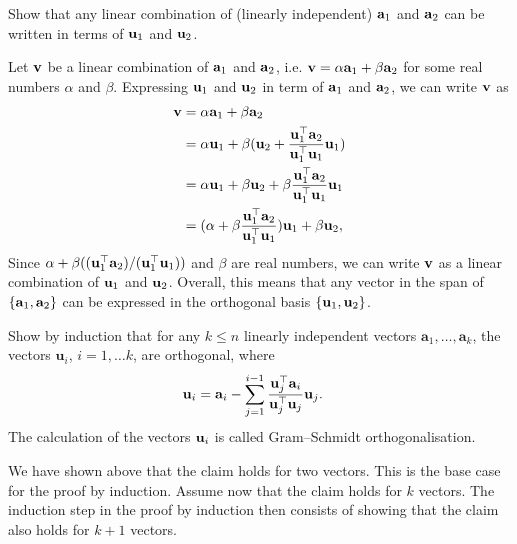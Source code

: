 \begin{exenumerate}
\item Show that any linear combination of (linearly independent) $\mathbf{a}_1$ and $\mathbf{a}_2$ can be written in terms of $\mathbf{u}_1$ and $\mathbf{u}_2$. 
  \begin{solution}
    Let $\mathbf{v}$ be a linear combination of $\mathbf{a}_1$ and $\mathbf{a}_2$, i.e. $\mathbf{v} = \alpha{\mathbf{a}_1} + \beta{\mathbf{a}_2}$ for some real numbers $\alpha$ and $\beta$.
    Expressing $\mathbf{u}_1$ and $\mathbf{u}_2$ in term of $\mathbf{a}_1$ and $\mathbf{a}_2$, we can write $\mathbf{v}$ as
    \begin{align}
      \mathbf{v}  &= \alpha \mathbf{a}_1 + \beta\mathbf{a}_2 \\
          &= \alpha\mathbf{u}_1 + \beta(\mathbf{u}_2 + \frac{\mathbf{u}_1^\top\mathbf{a}_2}{\mathbf{u}_1^\top\mathbf{u}_1}\mathbf{u}_1) \\
          &= \alpha\mathbf{u}_1 + \beta\mathbf{u}_2 + \beta \frac{\mathbf{u}_1^\top\mathbf{a}_2}{\mathbf{u}_1^\top\mathbf{u}_1}\mathbf{u}_1 \\
          &= (\alpha + \beta\frac{\mathbf{u}_1^\top\mathbf{a}_2}{\mathbf{u}_1^\top\mathbf{u}_1})\mathbf{u}_1 + \beta\mathbf{u}_2,
    \end{align}
    Since $\alpha + \beta((\mathbf{u}_1^\top\mathbf{a}_2)/(\mathbf{u}_1^\top\mathbf{u}_1))$ and $\beta$ are real
    numbers, we can write $\mathbf{v}$ as a linear combination of $\mathbf{u}_1$ and
    $\mathbf{u}_2$. Overall, this means that any vector in the span of $\{\mathbf{a}_1, \mathbf{a}_2\}$
    can be expressed in the orthogonal basis $\{\mathbf{u}_1, \mathbf{u}_2\}$.
    
  \end{solution}

\item Show by induction that for any $k \le n$ linearly independent vectors
  $\mathbf{a}_1,\ldots,\mathbf{a}_k$, the vectors $\mathbf{u}_i$, $i=1, \ldots
  k$, are orthogonal, where
  \begin{align}
    \mathbf{u}_i &= \mathbf{a}_i - \sum_{j=1}^{i-1} \frac{\mathbf{u}_j^\top \mathbf{a}_i}{\mathbf{u}_j^\top\mathbf{u}_j} \mathbf{u}_j. \label{eq:Gram-Schmidt-basis-def}
  \end{align}
  The calculation of the vectors $\mathbf{u}_i$ is called Gram–Schmidt orthogonalisation.
  \begin{solution}
   We have shown above that the claim holds for two vectors. This is the base
   case for the proof by induction. Assume now that the claim holds for $k$
   vectors. The induction step in the proof by induction then consists of
   showing that the claim also holds for $k+1$ vectors.
   

\end{solution}
\end{exenumerate}

